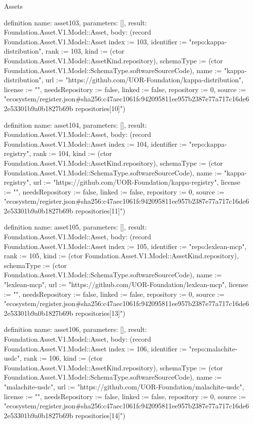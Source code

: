 \begin{lexlean}{Assets}
\begin{semanticmodule}
definition{
  name: asset103,
  parameters: [],
  result: Foundation.Asset.V1.Model::Asset,
  body: (record Foundation.Asset.V1.Model::Asset {index := 103, identifier := "repo:kappa-distribution", rank := 103, kind := (ctor Foundation.Asset.V1.Model::AssetKind.repository), schemaType := (ctor Foundation.Asset.V1.Model::SchemaType.softwareSourceCode), name := "kappa-distribution", url := "https://github.com/UOR-Foundation/kappa-distribution", license := "", needsRepository := false, linked := false, repository := 0, source := "ecosystem/register.json#sha256:c47aec1061fc942095811ee957b2387e77a717c16de62e53301b9a0b1827b69b repositories[10]"})
}

definition{
  name: asset104,
  parameters: [],
  result: Foundation.Asset.V1.Model::Asset,
  body: (record Foundation.Asset.V1.Model::Asset {index := 104, identifier := "repo:kappa-registry", rank := 104, kind := (ctor Foundation.Asset.V1.Model::AssetKind.repository), schemaType := (ctor Foundation.Asset.V1.Model::SchemaType.softwareSourceCode), name := "kappa-registry", url := "https://github.com/UOR-Foundation/kappa-registry", license := "", needsRepository := false, linked := false, repository := 0, source := "ecosystem/register.json#sha256:c47aec1061fc942095811ee957b2387e77a717c16de62e53301b9a0b1827b69b repositories[11]"})
}

definition{
  name: asset105,
  parameters: [],
  result: Foundation.Asset.V1.Model::Asset,
  body: (record Foundation.Asset.V1.Model::Asset {index := 105, identifier := "repo:lexlean-mcp", rank := 105, kind := (ctor Foundation.Asset.V1.Model::AssetKind.repository), schemaType := (ctor Foundation.Asset.V1.Model::SchemaType.softwareSourceCode), name := "lexlean-mcp", url := "https://github.com/UOR-Foundation/lexlean-mcp", license := "", needsRepository := false, linked := false, repository := 0, source := "ecosystem/register.json#sha256:c47aec1061fc942095811ee957b2387e77a717c16de62e53301b9a0b1827b69b repositories[13]"})
}

definition{
  name: asset106,
  parameters: [],
  result: Foundation.Asset.V1.Model::Asset,
  body: (record Foundation.Asset.V1.Model::Asset {index := 106, identifier := "repo:malachite-usdc", rank := 106, kind := (ctor Foundation.Asset.V1.Model::AssetKind.repository), schemaType := (ctor Foundation.Asset.V1.Model::SchemaType.softwareSourceCode), name := "malachite-usdc", url := "https://github.com/UOR-Foundation/malachite-usdc", license := "", needsRepository := false, linked := false, repository := 0, source := "ecosystem/register.json#sha256:c47aec1061fc942095811ee957b2387e77a717c16de62e53301b9a0b1827b69b repositories[14]"})
}


\end{semanticmodule}
\end{lexlean}
